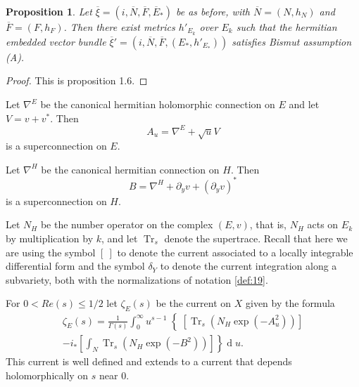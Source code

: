 \documentclass[10pt,twoside]{article}
\numberwithin{equation}{section}
\theoremstyle{plain}
\newtheorem{proposition}[equation]{Proposition}
\theoremstyle{definition}
\DeclareMathOperator{\Tr}{Tr}
\DeclareMathOperator{\dd}{d}
\begin{document}
\begin{proposition} \label{prop:8}
Let $\overline {\xi}=(i,\overline N,\overline
F, \overline E_{\ast})$ be as before, with $\overline N=(N,h_{N})$ and
$\overline F=(F,h_{F})$. Then there exist metrics $h'_{E_{k}}$ over
$E_{k}$ such that the hermitian embedded vector bundle $\overline
{\xi}'=(i,\overline N,\overline F, 
(E_{\ast},h'_{E_{\ast}}))$ satisfies Bismut assumption (A).
\end{proposition}
\begin{proof}
  This is \cite{bismut90:SCCI} proposition 1.6.
\end{proof}

Let $\nabla^{E}$ be the canonical hermitian holomorphic connection on
$E$ and let $V=v+v^{\ast}$. Then
\begin{displaymath}
  A_{u}=\nabla^{E}+\sqrt{u}V
\end{displaymath}
is a superconnection on $E$. 

Let $\nabla ^{H}$ be the canonical hermitian connection on $H$. Then
\begin{displaymath}
  B=\nabla ^{H}+ \partial_{y}v+(\partial_{y}v)^{\ast}
\end{displaymath}
is a superconnection on $H$.

Let $N_{H}$ be the number operator on the complex $(E,v)$, that is,
$N_{H}$ acts on $E_{k}$ by multiplication by $k$, and let $\Tr_{s}$
denote the supertrace. Recall that here we are using the symbol $\left[\
\right]$ to 
denote the current associated to a locally integrable differential
form and the symbol $\delta _{Y}$ to denote the current integration
along a subvariety, both with the normalizations of
notation \ref{def:19}.  

For $0<Re(s)\le 1/2$ let $\zeta_{E}(s)$ be the current on $X$ given by
the formula
\begin{multline}
  \label{eq:41}
  \zeta_{E}(s)=\frac{1}{\Gamma (s)}\left.\int_{0}^{\infty}u^{s-1}
  \right\{\left[\Tr_{s}\left(N_{H}\exp(-A_{u}^{2})\right)\right]\\
  -\left.i_{\ast}\left[\int_{N}\Tr_{s}\left(N_{H}\exp(-B^{2})\right)\right] 
    \right\}\dd u.
\end{multline}
This current is well defined and extends to a current that depends
holomorphically on $s$ near $0$.
\end{document}
